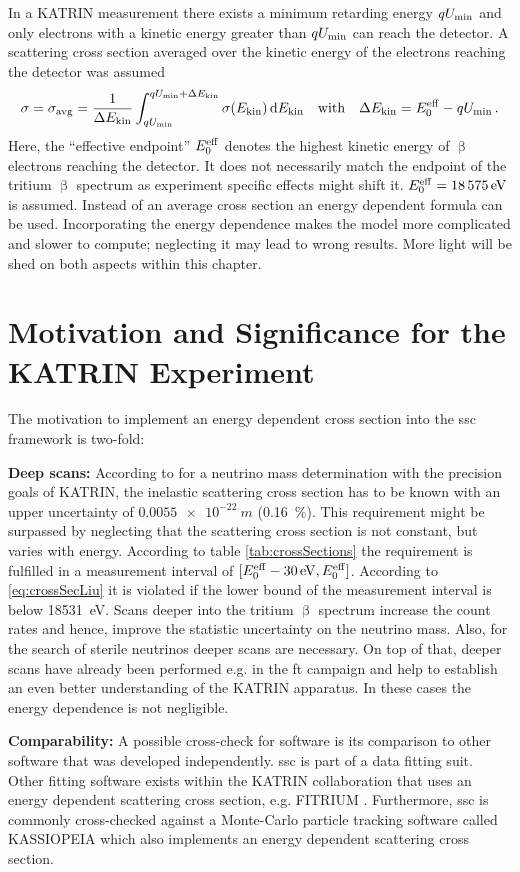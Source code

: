 In a KATRIN measurement there exists a minimum retarding energy $qU_\mathrm{min}$ and only electrons with a kinetic energy greater than $qU_\mathrm{min}$ can reach the detector. A scattering cross section averaged over the kinetic energy of the electrons reaching the detector was assumed
\begin{equation}
\sigma = \sigma_\mathrm{avg} = 
\frac{1}{\Delta E_\mathrm{kin}} 
\int_{qU_\mathrm{min}}^{qU_\mathrm{min}+\Delta E_\mathrm{kin}} \sigma(E_\mathrm{kin}) \mathop{}\!\mathrm{d} E_\mathrm{kin} 
\quad \text{with} \quad
\Delta E_\mathrm{kin} = E_0^\mathrm{eff}-qU_\mathrm{min}
\text{\,.}
\end{equation}
Here, the ``effective endpoint'' $E_0^\mathrm{eff}$ denotes the highest kinetic energy of $\upbeta$ electrons reaching the detector. It does not necessarily match the endpoint of the tritium $\upbeta$ spectrum as experiment specific effects might shift it. $E_0^\mathrm{eff}=\SI{18575}{eV}$ is assumed. Instead of an average cross section an energy dependent formula can be used. Incorporating the energy dependence makes the model more complicated and slower to compute; neglecting it may lead to wrong results. More light will be shed on both aspects within this chapter.

\section{Motivation and Significance for the KATRIN Experiment}
The motivation to implement an energy dependent cross section into the \gls{ssc} framework is two-fold:
\par{\textbf{Deep scans:} According to \cite{Groh2015} for a neutrino mass determination with the precision goals of KATRIN, the inelastic scattering cross section has to be known with an upper uncertainty of $\SI{0.0055e-22}{m}$ (\SI{0.16}{\percent}). This requirement might be surpassed by neglecting that the scattering cross section is not constant, but varies with energy. According to table \ref{tab:crossSections} the requirement is fulfilled in a measurement interval of $[E_0^\mathrm{eff}-\SI{30}{eV}, E_0^\mathrm{eff}]$. According to \eqref{eq:crossSecLiu} it is violated if the lower bound of the measurement interval is below \SI{18531}{eV}. Scans deeper into the tritium $\upbeta$ spectrum increase the count rates and hence, improve the statistic uncertainty on the neutrino mass. Also, for the search of sterile neutrinos deeper scans are necessary. On top of that, deeper scans have already been performed e.g. in the \gls{ft} campaign and help to establish an even better understanding of the KATRIN apparatus. In these cases the energy dependence is not negligible.}
\par{\textbf{Comparability:} A possible cross-check for software is its comparison to other software that was developed independently. \gls{ssc} is part of a data fitting suit. Other fitting software exists within the KATRIN collaboration that uses an energy dependent scattering cross section, e.g. FITRIUM \cite{Fitrium}. Furthermore, \gls{ssc} is commonly cross-checked against a Monte-Carlo particle tracking software called KASSIOPEIA \cite{KATRINCOL2019} which also implements an energy dependent scattering cross section.}


